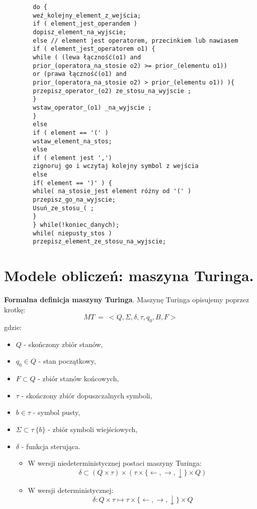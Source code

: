 \documentclass[main.tex]{subfiles}
\begin{document}
    \begin{verbatim}
        do {
        weź_kolejny_element_z_wejścia;
        if ( element_jest_operandem )
        dopisz_element_na_wyjscie;
        else // element jest operatorem, przecinkiem lub nawiasem
        if ( element_jest_operatorem o1) {
        while ( (lewa łączność(o1) and
        prior_(operatora_na_stosie o2) >= prior_(elementu o1))
        or (prawa łączność(o1) and
        prior_(operatora_na_stosie o2) > prior_(elementu o1)) ){
        przepisz_operator_(o2) ze_stosu_na_wyjscie ;
        }
        wstaw_operator_(o1) _na_wyjscie ;
        }
        else
        if ( element == '(' )
        wstaw_element_na_stos;
        else
        if ( element jest ',')
        zignoruj go i wczytaj kolejny symbol z wejścia
        else
        if( element == ')' ) {
        while( na_stosie_jest element różny od '(' )
        przepisz_go_na_wyjscie;
        Usuń_ze_stosu_( ;
        }
        } while(!koniec_danych);
        while( niepusty_stos )
        przepisz_element_ze_stosu_na_wyjscie;
    \end{verbatim}

    \newpage

    \section{Modele obliczeń: maszyna Turinga.}

    \begin{definition}
        \textbf{Formalna definicja maszyny Turinga}. Maszynę Turinga opisujemy poprzez krotkę:
        \[MT ~ = ~<Q, \Sigma, \delta, \tau, q_0, B, F >\]
        gdzie:
        \begin{itemize}
            \item $Q$ - skończony zbiór stanów,
            \item $q_0 \in Q$ - stan początkowy,
            \item $F \subset Q$ - zbiór stanów końcowych,
            \item $\tau$  - skończony zbiór dopuszczalnych symboli,
            \item $b \in \tau$  - symbol pusty,
            \item $\Sigma \subset \tau \ \{b\} $ - zbiór symboli wiejściowych,
            \item $\delta$ - funkcja sterująca.
            \begin{itemize}
                \item W wersji niedeterministycznej postaci maszyny Turinga:
                \[ \delta \subset (Q \times \tau)  \times (\tau \times \{\leftarrow, \rightarrow, \downarrow\}  \times Q)\]
                \item W wersji deterministycznej:
                \[ \delta : Q \times \tau \mapsto \tau \times \{\leftarrow, \rightarrow, \downarrow\} \times Q\]
            \end{itemize}
        \end{itemize}
    \end{definition}
\end{document}
